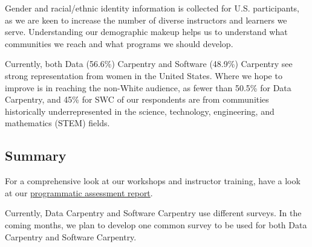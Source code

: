 \documentclass[]{article}
\begin{document}
Gender and racial/ethnic identity information is collected for U.S.
participants, as we are keen to increase the number of diverse
instructors and learners we serve. Understanding our demographic makeup
helps us to understand what communities we reach and what programs we
should develop.

Currently, both Data (56.6\%) Carpentry and Software (48.9\%) Carpentry
see strong representation from women in the United States. Where we hope
to improve is in reaching the non-White audience, as fewer than 50.5\%
for Data Carpentry, and 45\% for SWC of our respondents are from
communities historically underrepresented in the science, technology,
engineering, and mathematics (STEM) fields.

\subsection{Summary}\label{summary}

For a comprehensive look at our workshops and instructor training, have
a look at our
\href{https://carpentries.github.io/assessment/programmatic-assessment/workshops/outputs/final_report.html}{programmatic
assessment report}.

Currently, Data Carpentry and Software Carpentry use different surveys.
In the coming months, we plan to develop one common survey to be used
for both Data Carpentry and Software Carpentry.
\end{document}
